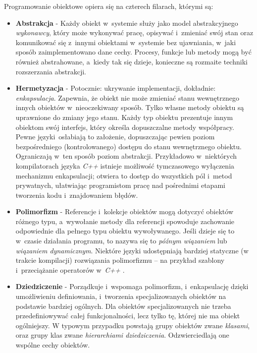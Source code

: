       Programowanie obiektowe opiera się na czterech filarach, którymi są:
      \begin{itemize}
        \item \textbf{Abstrakcja} - Każdy obiekt w~systemie służy jako model abstrakcyjnego \textit{wykonawcy}, który może wykonywać pracę, opisywać i~zmieniać swój stan oraz komunikować się z~innymi obiektami w~systemie bez ujawniania, w~jaki sposób zaimplementowano dane cechy. Procesy, funkcje lub metody mogą być również abstrahowane, a~kiedy tak się dzieje, konieczne są rozmaite techniki rozszerzania abstrakcji.

        \item \textbf{Hermetyzacja} - Potocznie: ukrywanie implementacji, dokładnie: \textit{enkapsulacja}. Zapewnia, że obiekt nie może zmieniać stanu wewnętrznego innych obiektów w~nieoczekiwany sposób. Tylko własne metody obiektu są uprawnione do zmiany jego stanu. Każdy typ obiektu prezentuje innym obiektom swój interfejs, który określa dopuszczalne metody współpracy. Pewne języki~osłabiają to założenie, dopuszczając pewien poziom bezpośredniego (kontrolowanego) dostępu do stanu wewnętrznego obiektu. Ograniczają w~ten sposób poziom abstrakcji. Przykładowo w~niektórych kompilatorach języka \textit{C++} istnieje możliwość tymczasowego wyłączenia mechanizmu enkapsulacji; otwiera to dostęp do wszystkich pól i~metod prywatnych, ułatwiając programistom pracę nad pośrednimi etapami tworzenia kodu i~znajdowaniem błędów.

        \item \textbf{Polimorfizm} - Referencje i~kolekcje obiektów mogą dotyczyć obiektów różnego typu, a~wywołanie metody dla referencji spowoduje zachowanie odpowiednie dla pełnego typu obiektu wywoływanego. Jeśli dzieje się to w~czasie działania programu, to nazywa się to \textit{późnym wiązaniem} lub \textit{wiązaniem dynamicznym}. Niektóre języki udostępniają bardziej statyczne (w trakcie kompilacji) rozwiązania polimorfizmu – na przykład szablony i~przeciążanie operatorów w~\textit{C++} \cite{CppStroustrup}.

        \item \textbf{Dziedziczenie} - Porządkuje i~wspomaga polimorfizm, i~enkapsulację dzięki umożliwieniu definiowania, i~tworzenia specjalizowanych obiektów na podstawie bardziej ogólnych. Dla obiektów specjalizowanych nie trzeba przedefiniowywać całej funkcjonalności, lecz tylko tę, której nie ma obiekt ogólniejszy. W typowym przypadku powstają grupy obiektów zwane \textit{klasami}, oraz grupy klas zwane \textit{hierarchiami dziedziczenia}. Odzwierciedlają one wspólne cechy obiektów.
      \end{itemize}

